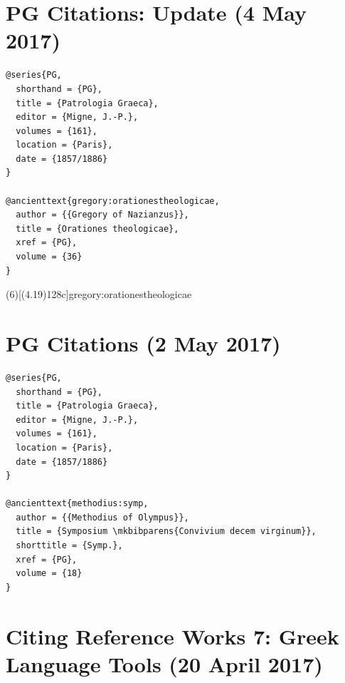 \documentclass[a4paper]{article}
\begin{document}
\section{PG Citations: Update (4 May 2017)}

\begin{verbatim}
@series{PG,
  shorthand = {PG},
  title = {Patrologia Graeca},
  editor = {Migne, J.-P.},
  volumes = {161},
  location = {Paris},
  date = {1857/1886}
}

@ancienttext{gregory:orationestheologicae,
  author = {{Gregory of Nazianzus}},
  title = {Orationes theologicae},
  xref = {PG},
  volume = {36}
}
\end{verbatim}

\examplecite(6)[(4.19)128c]{gregory:orationestheologicae}
\exampleabbreviations
{}

\section{PG Citations (2 May 2017)}

\begin{verbatim}
@series{PG,
  shorthand = {PG},
  title = {Patrologia Graeca},
  editor = {Migne, J.-P.},
  volumes = {161},
  location = {Paris},
  date = {1857/1886}
}

@ancienttext{methodius:symp,
  author = {{Methodius of Olympus}},
  title = {Symposium \mkbibparens{Convivium decem virginum}},
  shorttitle = {Symp.},
  xref = {PG},
  volume = {18}
}
\end{verbatim}

\exampleancientsources
\examplesecondarysources
{}

\section{Citing Reference Works 7: Greek Language Tools (20 April 2017)}
\end{document}
